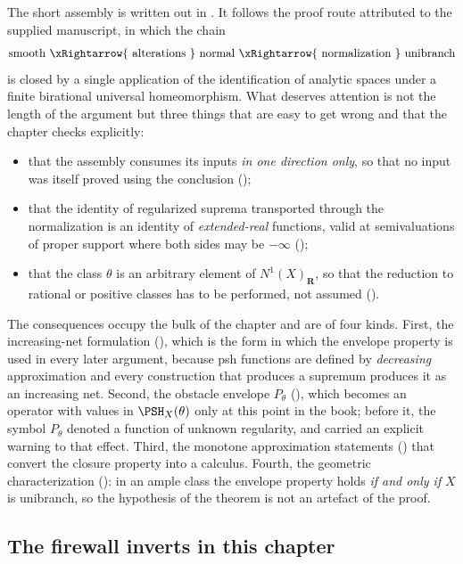 The short assembly is written out in .
It follows the proof route attributed to the supplied manuscript, in which
the chain
\[
 \text{smooth}
 \ \xRightarrow{\ \text{alterations}\ }\ \text{normal}
 \ \xRightarrow{\ \text{normalization}\ }\ \text{unibranch}
\]
is closed by a single application of the identification of analytic spaces
under a finite birational universal homeomorphism.  What deserves attention
is not the length of the argument but three things that are easy to get
wrong and that the chapter checks explicitly:

\begin{itemize}
\item that the assembly consumes its inputs \emph{in one direction only},
      so that no input was itself proved using the conclusion
      ();
\item that the identity of regularized suprema transported through the
      normalization is an identity of \emph{extended-real} functions, valid
      at semivaluations of proper support where both sides may be
      $-\infty$ ();
\item that the class $\theta$ is an arbitrary element of
      $N^1(X)_{\mathbf R}$, so that the reduction to rational or positive
      classes has to be performed, not assumed
      ().
\end{itemize}

The consequences occupy the bulk of the chapter and are of four kinds.
First, the increasing-net formulation
(), which is the form in which the envelope property is
used in every later argument, because psh functions are defined by
\emph{decreasing} approximation and every construction that produces a
supremum produces it as an increasing net.  Second, the obstacle envelope
$P_\theta$ (), which becomes an operator with
values in $\PSH_X(\theta)$ only at this point in the book; before it, the
symbol $P_\theta$ denoted a function of unknown regularity, and
 carried an explicit warning to that effect.
Third, the monotone approximation statements
() that convert the closure property into a
calculus.  Fourth, the geometric characterization
(): in an ample class the envelope property
holds \emph{if and only if} $X$ is unibranch, so the hypothesis of the
theorem is not an artefact of the proof.

\subsection{The firewall inverts in this chapter}
\label{sec:ch45-firewall-inverts}

